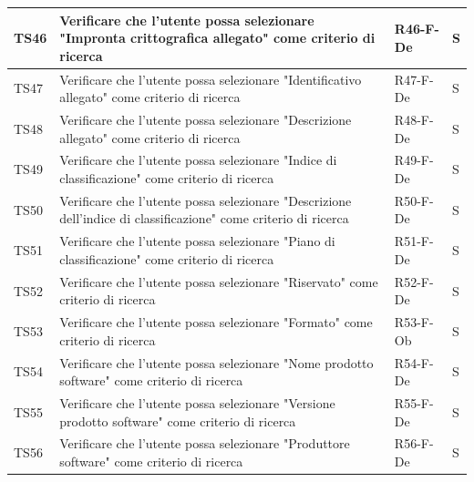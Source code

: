 \documentclass[a4paper,12pt]{article}
\begin{document}
\begin{longtable}{|M{1.2cm}|M{6.3cm}|M{2.5cm}|M{1.5cm}|}
                TS46 & Verificare che l'utente possa selezionare "Impronta crittografica allegato" come criterio di ricerca & R46-F-De & S \\
                \hline

                TS47 & Verificare che l'utente possa selezionare "Identificativo allegato" come criterio di ricerca & R47-F-De & S \\
                \hline

                TS48 & Verificare che l'utente possa selezionare "Descrizione allegato" come criterio di ricerca & R48-F-De & S \\
                \hline

                TS49 & Verificare che l'utente possa selezionare "Indice di classificazione" come criterio di ricerca & R49-F-De & S \\
                \hline

                TS50 & Verificare che l'utente possa selezionare "Descrizione dell'indice di classificazione" come criterio di ricerca & R50-F-De & S \\
                \hline

                TS51 & Verificare che l'utente possa selezionare "Piano di classificazione" come criterio di ricerca & R51-F-De & S \\
                \hline

                TS52 & Verificare che l'utente possa selezionare "Riservato" come criterio di ricerca & R52-F-De & S \\
                \hline

                TS53 & Verificare che l'utente possa selezionare "Formato" come criterio di ricerca & R53-F-Ob & S \\
                \hline

                TS54 & Verificare che l'utente possa selezionare "Nome prodotto software" come criterio di ricerca & R54-F-De & S \\
                \hline

                TS55 & Verificare che l'utente possa selezionare "Versione prodotto software" come criterio di ricerca & R55-F-De & S \\
                \hline

                TS56 & Verificare che l'utente possa selezionare "Produttore software" come criterio di ricerca & R56-F-De & S \\
                \hline


\end{longtable}
\end{document}
